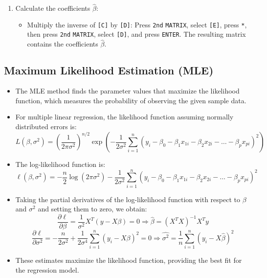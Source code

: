 \documentclass{article}
\newcommand{\code}[1]{\colorbox{light-gray}{\texttt{#1}}}
\begin{document}
\begin{enumerate}
\begin{itemize}
    \end{itemize}
    \item Calculate the coefficients $\hat{\beta}$:
    \begin{itemize}
        \item Multiply the inverse of \code{[C]} by \code{[D]}: Press \code{2nd} \code{MATRIX}, select \code{[E]}, press \code{*}, then press \code{2nd} \code{MATRIX}, select \code{[D]}, and press \code{ENTER}. The resulting matrix contains the coefficients $\hat{\beta}$.
    \end{itemize}
\end{enumerate}
    
\subsection{Maximum Likelihood Estimation (MLE)}

\begin{itemize}
    \item The MLE method finds the parameter values that maximize the likelihood function, which measures the probability of observing the given sample data.
    \item For multiple linear regression, the likelihood function assuming normally distributed errors is:
    \[
    L(\beta, \sigma^2) = \left( \frac{1}{2\pi\sigma^2} \right)^{n/2} \exp\left(-\frac{1}{2\sigma^2} \sum_{i=1}^{n} (y_i - \beta_0 - \beta_1 x_{1i} - \beta_2 x_{2i} - \dots - \beta_p x_{pi})^2 \right)
    \]
    \item The log-likelihood function is:
    \[
    \ell(\beta, \sigma^2) = -\frac{n}{2} \log(2\pi\sigma^2) - \frac{1}{2\sigma^2} \sum_{i=1}^{n} (y_i - \beta_0 - \beta_1 x_{1i} - \beta_2 x_{2i} - \dots - \beta_p x_{pi})^2
    \]
    \item Taking the partial derivatives of the log-likelihood function with respect to $\beta$ and $\sigma^2$ and setting them to zero, we obtain:
    \[
    \frac{\partial \ell}{\partial \beta} = \frac{1}{\sigma^2} X^T (y - X\beta) = 0 \Rightarrow \hat{\beta} = (X^TX)^{-1}X^Ty
    \]
    \[
    \frac{\partial \ell}{\partial \sigma^2} = -\frac{n}{2\sigma^2} + \frac{1}{2\sigma^4} \sum_{i=1}^{n} (y_i - X\beta)^2 = 0 \Rightarrow \hat{\sigma^2} = \frac{1}{n} \sum_{i=1}^{n} (y_i - X\hat{\beta})^2
    \]
    \item These estimates maximize the likelihood function, providing the best fit for the regression model.
\end{itemize}
\end{document}
